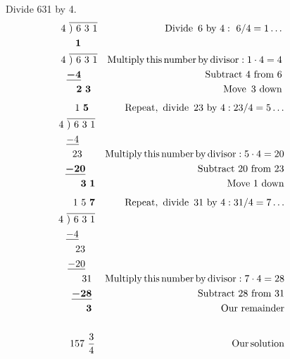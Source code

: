 \begin{example}~~~Divide 631 by 4.
  \begin{eqnarray*}
    ~~4~\overline{)~6~3~1} &  & \tmop{Divide~} 6 \text{~by~} 4:~6/4 = 1 \ldots\\
    \tmmathbf{1}~~~~~  &  & \\
    ~~4~\overline{)~6~3~1} &  & \tmop{Multiply} \tmop{this} \tmop{number} \tmop{by}
    \tmop{divisor} : 1 \cdot 4 = 4\\
    \tmmathbf{\underline{- 4}}~~~~~ &  & \text{Subtract~} 4 \text{~from~} 6\\
    \tmmathbf{2~3}~~  &  & \tmop{Move~} 3 \text{~down}%
  \end{eqnarray*}
	\begin{eqnarray*}
    1 ~\tmmathbf{5}~~  &  & \tmop{Repeat}, \tmop{~divide~} 23 \text{~by~} 4 : 23/4 = 5 \ldots\\
    ~~4~\overline{)~6~3~1} &  & \\
    \underline{- 4}~~~~~&  & \\
    23~~~~ &  & \tmop{Multiply} \tmop{this} \tmop{number} \tmop{by} \tmop{divisor}
    : 5 \cdot 4 = 20\\
    \tmmathbf{\underline{- 20}}~~~ &  & \text{Subtract~} 20 \text{~from~} 23\\
    \tmmathbf{3~1} &  & \text{Move~} 1 \text{~down}%
  \end{eqnarray*}
	\begin{eqnarray*}
    1~5 ~\boldsymbol{7}  &  & \operatorname{Repeat}, \operatorname{~divide~} 31 \text{~by~} 4 : 31/4 = 7 \ldots\\
    ~~4~\overline{)~6~3~1} &  & \\
    \underline{- 4}~~~~~&  & \\
    23~~~ &  & \\
    \underline{- 20}~~~ &  & \\
    31~ &  & \operatorname{Multiply} \operatorname{this} \operatorname{number} \operatorname{by} \operatorname{divisor}
    : 7 \cdot 4 = 28\\
    \boldsymbol{\underline{- 28}}~ &  & \text{Subtract~} 28 \text{~from~} 31\\
    \boldsymbol{3}~ &  & \text{Our~remainder}\\
		& & \\
	  157 ~\frac{3}{4} &  & \operatorname{Our} \operatorname{solution}
  \end{eqnarray*}
\end{example}

